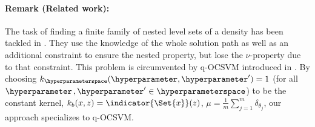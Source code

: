 \paragraph{Remark (Related work):}
The task of finding a finite family of nested level sets of a density has been
tackled in \citep{lee2010nested}. They use the knowledge of the whole solution
path as well as an additional constraint to ensure the nested property, but
lose the $\nu$-property due to that constraint. This problem is circumvented
by q-\acs{OCSVM} introduced in \citep{glazer2013q}.
By choosing $k_{\hyperparameterspace}(\hyperparameter,
\hyperparameter')=1$ (for all $\hyperparameter\,, \hyperparameter'\in
\hyperparameterspace$) to be the constant kernel, $k_b(x, z) =
\indicator{\Set{x}}(z)$, $\mu=\frac{1}{m}\sum_{j=1}^m \delta_{\theta_j}$, our
approach specializes to q-\acs{OCSVM}.

